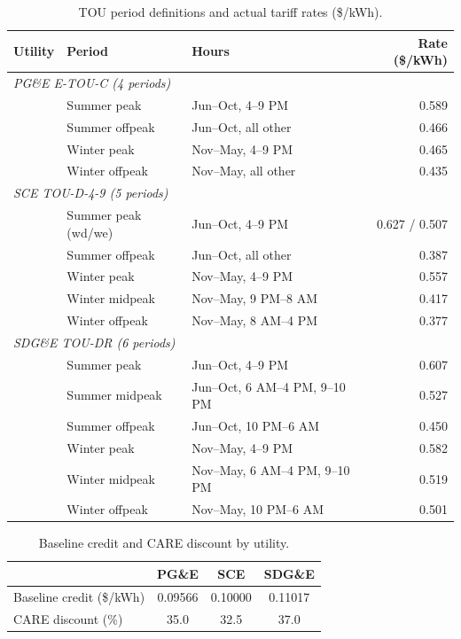 \documentclass[9pt]{article}
\begin{document}
\begin{table}[htbp]
\centering
\caption{TOU period definitions and actual tariff rates (\$/kWh).}
\label{tab:tou_rates}
\begin{tabular}{l l l r}
\toprule
\textbf{Utility} & \textbf{Period} & \textbf{Hours} & \textbf{Rate (\$/kWh)} \\
\midrule
\multicolumn{4}{l}{\textit{PG\&E E-TOU-C (4 periods)}} \\
& Summer peak & Jun--Oct, 4--9 PM & 0.589 \\
& Summer offpeak & Jun--Oct, all other & 0.466 \\
& Winter peak & Nov--May, 4--9 PM & 0.465 \\
& Winter offpeak & Nov--May, all other & 0.435 \\
\midrule
\multicolumn{4}{l}{\textit{SCE TOU-D-4-9 (5 periods)}} \\
& Summer peak (wd/we) & Jun--Oct, 4--9 PM & 0.627 / 0.507 \\
& Summer offpeak & Jun--Oct, all other & 0.387 \\
& Winter peak & Nov--May, 4--9 PM & 0.557 \\
& Winter midpeak & Nov--May, 9 PM--8 AM & 0.417 \\
& Winter offpeak & Nov--May, 8 AM--4 PM & 0.377 \\
\midrule
\multicolumn{4}{l}{\textit{SDG\&E TOU-DR (6 periods)}} \\
& Summer peak & Jun--Oct, 4--9 PM & 0.607 \\
& Summer midpeak & Jun--Oct, 6 AM--4 PM, 9--10 PM & 0.527 \\
& Summer offpeak & Jun--Oct, 10 PM--6 AM & 0.450 \\
& Winter peak & Nov--May, 4--9 PM & 0.582 \\
& Winter midpeak & Nov--May, 6 AM--4 PM, 9--10 PM & 0.519 \\
& Winter offpeak & Nov--May, 10 PM--6 AM & 0.501 \\
\bottomrule
\end{tabular}
\end{table}

\begin{table}[htbp]
\centering
\caption{Baseline credit and CARE discount by utility.}
\begin{tabular}{l c c c}
\toprule
& \textbf{PG\&E} & \textbf{SCE} & \textbf{SDG\&E} \\
\midrule
Baseline credit (\$/kWh) & 0.09566 & 0.10000 & 0.11017 \\
CARE discount (\%) & 35.0 & 32.5 & 37.0 \\
\bottomrule
\end{tabular}
\end{table}
\end{document}
